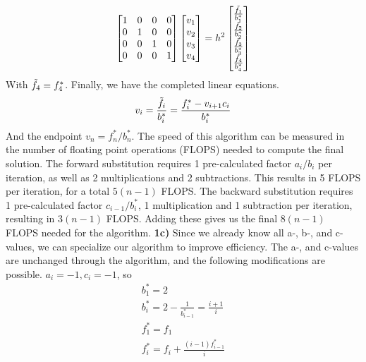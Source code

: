 \documentclass{article}
\begin{document}
\begin{equation}
    \begin{bmatrix}
        1 & 0 & 0 & 0 \\
        0 & 1 & 0 & 0 \\
        0 & 0 & 1 & 0 \\
        0 & 0 & 0 & 1
    \end{bmatrix}
    \begin{bmatrix}
        v_1 \\ v_2 \\ v_3 \\v_4
    \end{bmatrix}
    =h^2\begin{bmatrix}
        \frac{\Tilde{f_1}}{b_1^*}\\
        \frac{\Tilde{f_2}}{b_2^*}\\
        \frac{\Tilde{f_3}}{b_3^*}\\
        \frac{\Tilde{f_4}}{b_4^*}
    \end{bmatrix}
\end{equation}
With $\Tilde{f_4} = f_4^*$. Finally, we have the completed linear equations.
\begin{equation}
    \begin{gathered}
        v_{i} = \frac{\Tilde{f_{i}}}{b_i^*} = \frac{f_{i}^* - v_{i+1}c_i}{b_i^*} 
    \end{gathered}
\end{equation}
And the endpoint $v_n = f_n^*/b_n^*$.
\newline The speed of this algorithm can be measured in the number of floating point operations (FLOPS) needed to compute the final solution. The forward substitution requires 1 pre-calculated factor $a_i/b_i$ per iteration, as well as 2 multiplications and 2 subtractions. This results in 5 FLOPS per iteration, for a total $5(n-1)$ FLOPS.
The backward substitution requires 1 pre-calculated factor $c_{i-1}/b_{i}^*$, 1 multiplication and 1 subtraction per iteration, resulting in $3(n-1)$ FLOPS.
Adding these gives us the final $8(n-1)$ FLOPS needed for the algorithm.
\newline
\newline
\textbf{1c)}\newline
Since we already know all a-, b-, and c-values, we can specialize our algorithm to improve efficiency. The a-, and c-values are unchanged through the algorithm, and the following modifications are possible. $a_i = -1, c_i = -1$, so
\begin{equation}
    \begin{gathered}
    b_1^* = 2\\
    b_i^* = 2 - \frac{1}{b_{i-1}^*} = \frac{i+1}{i}  \\
    f_1^* = f_1 \\
    f_i^* = f_i + \frac{(i-1)f_{i-1}^*}{i}
    \end{gathered}
\end{equation}
\end{document}

